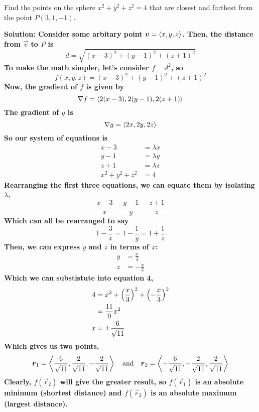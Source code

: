 \begin{example}
    Find the points on the sphere \(x^2+y^2+z^2=4\) that are closest and farthest from the point \(P(3, 1, -1)\).
    \par\bf{Solution: }
    Consider some arbitary point \(\boldsymbol{v} = \left\langle x, y, z\right\rangle\). Then, the distance from \(\vec v\) to \(P\) is 
    \[ d = \sqrt{(x-3)^2+(y-1)^2+(z+1)^2}\]
    To make the math simpler, let's consider \(f = d^2\), so
    \[ f(x, y, z) = (x-3)^2 + (y-1)^2+(z+1)^2\]
    Now, the gradient of \(f\) is given by
    \[ \nabla f = \left\langle 2(x-3), 2(y-1), 2(z+1) \right\rangle \]
    The gradient of \(g\) is
    \[ \nabla g = \left\langle 2x, 2y, 2z \right\rangle\]
    So our system of equations is
    \begin{align*}
        x-3 &= \lambda x \\
        y-1 &= \lambda y \\
        z+1 &= \lambda z \\
        x^2+y^2+z^2 &= 4
    \end{align*}
    Rearranging the first three equations, we can equate them by isolating \(\lambda\),
    \[ \frac{x-3}{x} = \frac{y-1}{y} = \frac{z+1}{z} \]
    Which can all be rearranged to say
    \[ 1-\frac{3}{x} = 1-\frac{1}{y} = 1+\frac{1}{z} \]
    Then, we can express \(y\) and \(z\) in terms of \(x\):
    \begin{align*}
        y &= \frac{x}{3} \\
        z &= -\frac{x}{3}
    \end{align*}
    Which we can substistute into equation 4,
    \begin{align*}
        4 &= x^2+\pqty{\frac{x}{3}}^2+\pqty{-\frac{x}{3}}^2 \\
        &= \frac{11}{9}x^2 \\
        x &= \pm\frac{6}{\sqrt{11}}
    \end{align*}
    Which gives us two points, \[\boldsymbol{r}_1 = \left\langle\frac{6}{\sqrt{11}}, \frac{2}{\sqrt{11}}, -\frac{2}{\sqrt{11}}\right\rangle\quad\text{and}\quad \boldsymbol{r}_2 = \left\langle -\frac{6}{\sqrt{11}}, -\frac{2}{\sqrt{11}},\frac{2}{\sqrt{11}}\right\rangle\]
    Clearly, \(f(\vec r_2)\) will give the greater result, so \(f(\vec r_1)\) is an absolute minimum (shortest distance) and \(f(\vec r_2)\) is an absolute maximum (largest distance).
\end{example}
